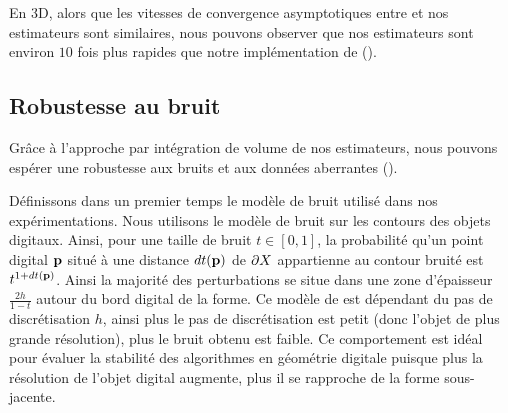 En 3D, alors que les vitesses de convergence asymptotiques entre \JetFitting et
nos estimateurs sont similaires, nous pouvons observer que nos estimateurs sont
environ $10$ fois plus rapides que notre implémentation de \JetFitting (\CGal \cite{CGal}).
%
\subsection{Robustesse au bruit}
\label{sec:kanungo-noise}
%
Grâce à l'approche par intégration de volume de nos estimateurs, nous pouvons
espérer une robustesse aux bruits et aux données aberrantes ().


Définissons dans un premier temps le modèle de bruit utilisé dans nos expérimentations.
Nous utilisons le modèle de bruit \Kanungo \cite{Kanungo1996} sur les contours
des objets digitaux. Ainsi, pour une taille de bruit $t \in [0,1]$, la
probabilité qu'un point digital $\mathbf{p}$ situé à une distance $dt(\mathbf{p})$ de $\partial X$
appartienne au contour bruité est $t^{1+dt(\mathbf{p})}$. Ainsi la majorité des
perturbations se situe dans une zone d'épaisseur $\frac{2h}{1-t}$ autour du bord
digital de la forme. Ce modèle de \Kanungo est dépendant du pas de
discrétisation $h$, ainsi plus le pas de discrétisation est petit (donc l'objet
de plus grande résolution), plus le bruit obtenu est faible. Ce comportement est
idéal pour évaluer la stabilité des algorithmes en géométrie digitale
\cite{Kerautret2012} puisque plus la résolution de l'objet digital augmente,
plus il se rapproche de la forme sous-jacente.


